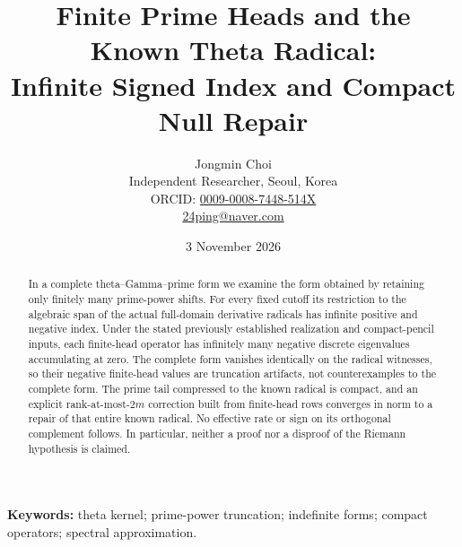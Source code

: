 \documentclass[11pt]{article}
\title{Finite Prime Heads and the Known Theta Radical:\\Infinite Signed Index and Compact Null Repair}
\author{Jongmin Choi\\\small Independent Researcher, Seoul, Korea\\\small ORCID: \href{https://orcid.org/0009-0008-7448-514X}{0009-0008-7448-514X}\\\small \href{mailto:24ping@naver.com}{24ping@naver.com}}
\date{3 November 2026}
\begin{document}
\maketitle
\begin{abstract}
In a complete theta--Gamma--prime form we examine the form obtained by retaining only finitely many prime-power shifts. For every fixed cutoff its restriction to the algebraic span of the actual full-domain derivative radicals has infinite positive and negative index. Under the stated previously established realization and compact-pencil inputs, each finite-head operator has infinitely many negative discrete eigenvalues accumulating at zero. The complete form vanishes identically on the radical witnesses, so their negative finite-head values are truncation artifacts, not counterexamples to the complete form. The prime tail compressed to the known radical is compact, and an explicit rank-at-most-$2m$ correction built from finite-head rows converges in norm to a repair of that entire known radical. No effective rate or sign on its orthogonal complement follows. In particular, neither a proof nor a disproof of the Riemann hypothesis is claimed.
\end{abstract}
\noindent\textbf{Keywords:} theta kernel; prime-power truncation; indefinite forms; compact operators; spectral approximation.
\end{document}
